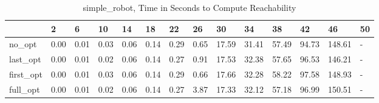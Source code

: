 \begin{table}
\caption{simple_robot, Time in Seconds to Compute Reachability}
\label{simple_robot_states_time}
\begin{tabular}{llllllllllllll}
\toprule
 & 2 & 6 & 10 & 14 & 18 & 22 & 26 & 30 & 34 & 38 & 42 & 46 & 50 \\
\midrule
no_opt & 0.00 & 0.01 & 0.03 & 0.06 & 0.14 & 0.29 & 0.65 & 17.59 & 31.41 & 57.49 & 94.73 & 148.61 & - \\
last_opt & 0.00 & 0.01 & 0.02 & 0.06 & 0.14 & 0.27 & 0.91 & 17.53 & 32.38 & 57.65 & 96.53 & 146.21 & - \\
first_opt & 0.00 & 0.01 & 0.03 & 0.06 & 0.14 & 0.29 & 0.66 & 17.66 & 32.28 & 58.22 & 97.58 & 148.93 & - \\
full_opt & 0.00 & 0.01 & 0.02 & 0.06 & 0.14 & 0.27 & 3.87 & 17.33 & 32.12 & 57.18 & 96.99 & 150.51 & - \\
\bottomrule
\end{tabular}
\end{table}
